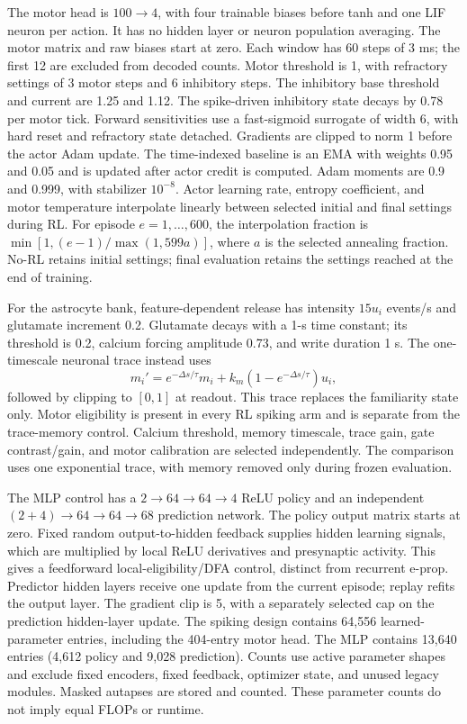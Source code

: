 The motor head is $100\to4$, with four trainable biases before tanh and one LIF neuron per action. It has no hidden layer or neuron population averaging. The motor matrix and raw biases start at zero. Each window has 60 steps of 3 ms; the first 12 are excluded from decoded counts. Motor threshold is 1, with refractory settings of 3 motor steps and 6 inhibitory steps. The inhibitory base threshold and current are 1.25 and 1.12. The spike-driven inhibitory state decays by 0.78 per motor tick. Forward sensitivities use a fast-sigmoid surrogate of width 6, with hard reset and refractory state detached. Gradients are clipped to norm 1 before the actor Adam update. The time-indexed baseline is an EMA with weights 0.95 and 0.05 and is updated after actor credit is computed. Adam moments are 0.9 and 0.999, with stabilizer $10^{-8}$. Actor learning rate, entropy coefficient, and motor temperature interpolate linearly between selected initial and final settings during RL. For episode $e=1,\ldots,600$, the interpolation fraction is $\min[1,(e-1)/\max(1,599a)]$, where $a$ is the selected annealing fraction. No-RL retains initial settings; final evaluation retains the settings reached at the end of training.

For the astrocyte bank, feature-dependent release has intensity $15u_i$ events/s and glutamate increment 0.2. Glutamate decays with a 1-s time constant; its threshold is 0.2, calcium forcing amplitude 0.73, and write duration 1 s. The one-timescale neuronal trace instead uses
\begin{equation}
 m_i' = e^{-\Delta s/\tau}m_i + k_m(1-e^{-\Delta s/\tau})u_i,
\end{equation}
followed by clipping to $[0,1]$ at readout. This trace replaces the familiarity state only. Motor eligibility is present in every RL spiking arm and is separate from the trace-memory control. Calcium threshold, memory timescale, trace gain, gate contrast/gain, and motor calibration are selected independently. The comparison uses one exponential trace, with memory removed only during frozen evaluation.

The MLP control has a $2\to64\to64\to4$ ReLU policy and an independent $(2+4)\to64\to64\to68$ prediction network. The policy output matrix starts at zero. Fixed random output-to-hidden feedback supplies hidden learning signals, which are multiplied by local ReLU derivatives and presynaptic activity. This gives a feedforward local-eligibility/DFA control, distinct from recurrent e-prop. Predictor hidden layers receive one update from the current episode; replay refits the output layer. The gradient clip is 5, with a separately selected cap on the prediction hidden-layer update. The spiking design contains 64,556 learned-parameter entries, including the 404-entry motor head. The MLP contains 13,640 entries (4,612 policy and 9,028 prediction). Counts use active parameter shapes and exclude fixed encoders, fixed feedback, optimizer state, and unused legacy modules. Masked autapses are stored and counted. These parameter counts do not imply equal FLOPs or runtime.

